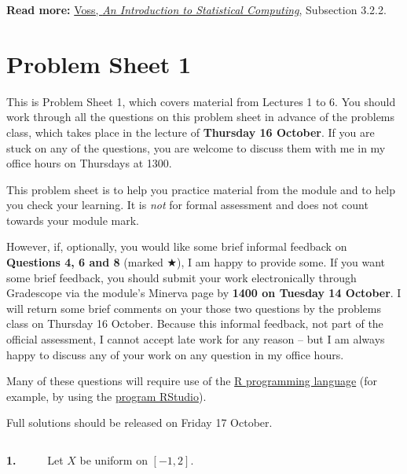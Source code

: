 \documentclass[
  letterpaper,
  DIV=11,
  numbers=noendperiod]{scrreprt}
\theoremstyle{plain}
\theoremstyle{definition}
\theoremstyle{definition}
\theoremstyle{remark}
\begin{document}
\textbf{Read more:}
\href{https://leeds.primo.exlibrisgroup.com/permalink/44LEE_INST/1fj430b/cdi_askewsholts_vlebooks_9781118728031}{Voss,
\emph{An Introduction to Statistical Computing}}, Subsection 3.2.2.

\chapter*{Problem Sheet 1}\label{P1}


This is Problem Sheet 1, which covers material from Lectures 1 to 6. You
should work through all the questions on this problem sheet in advance
of the problems class, which takes place in the lecture of
\textbf{Thursday 16 October}. If you are stuck on any of the questions,
you are welcome to discuss them with me in my office hours on Thursdays
at 1300.

This problem sheet is to help you practice material from the module and
to help you check your learning. It is \emph{not} for formal assessment
and does not count towards your module mark.

However, if, optionally, you would like some brief informal feedback on
\textbf{Questions 4, 6 and 8} (marked ★), I am happy to provide some. If
you want some brief feedback, you should submit your work electronically
through Gradescope via the module's Minerva page by \textbf{1400 on
Tuesday 14 October}. I will return some brief comments on your those two
questions by the problems class on Thursday 16 October. Because this
informal feedback, not part of the official assessment, I cannot accept
late work for any reason -- but I am always happy to discuss any of your
work on any question in my office hours.

Many of these questions will require use of the
\href{https://cran.r-project.org}{R programming language} (for example,
by using the \href{https://posit.co/downloads/}{program RStudio}).

Full solutions should be released on Friday 17 October.

\[\newcommand{\Exg}{\operatorname{\mathbb{E}}} 
\newcommand{\Ex}{\mathbb{E}} 
\newcommand{\Ind}{\mathbb{I}}
\newcommand{\Var}{\operatorname{Var}}
\newcommand{\Cov}{\operatorname{Cov}}
\newcommand{\Corr}{\operatorname{Corr}}
\newcommand{\ee}{\mathrm{e}}\]

\textbf{1.} ~~~~~Let \(X\) be uniform on \([-1,2]\).
\end{document}
